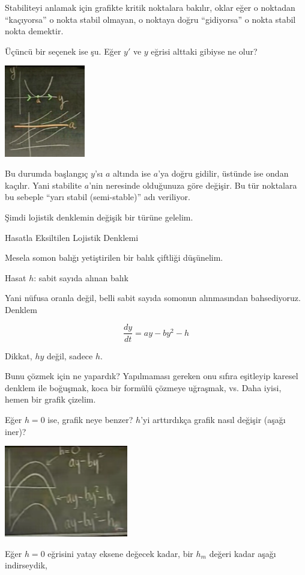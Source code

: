 \documentclass[12pt,fleqn]{article}\usepackage{../../common}
\begin{document}
Stabiliteyi anlamak için grafikte kritik noktalara bakılır, oklar eğer o
noktadan ``kaçıyorsa'' o nokta stabil olmayan, o noktaya doğru
``gidiyorsa'' o nokta stabil nokta demektir.

Üçüncü bir seçenek ise şu. Eğer $y'$ ve $y$ eğrisi alttaki gibiyse ne olur?

\includegraphics[height=4cm]{5_9.png}

Bu durumda başlangıç $y$'sı $a$ altında ise $a$'ya doğru gidilir, üstünde
ise ondan kaçılır. Yani stabilite $a$'nin neresinde olduğunuza göre
değişir. Bu tür noktalara bu sebeple ``yarı stabil (semi-stable)'' adı
veriliyor. 

Şimdi lojistik denklemin değişik bir türüne gelelim. 

Hasatla Eksiltilen Lojistik Denklemi

Mesela somon balığı yetiştirilen bir balık çiftliği düşünelim. 

Hasat $h$: sabit sayıda alınan balık

Yani nüfusa oranla değil, belli sabit sayıda somonun alınmasından
bahsediyoruz. Denklem

$$ \frac{dy}{dt} = ay - by^2 - h $$

Dikkat, $hy$ değil, sadece $h$. 

Bunu çözmek için ne yapardık? Yapılmaması gereken onu sıfıra eşitleyip
karesel denklem ile boğuşmak, koca bir formülü çözmeye uğraşmak, vs. Daha
iyisi, hemen bir grafik çizelim. 

Eğer $h=0$ ise, grafik neye benzer? $h$'yi arttırdıkça grafik nasıl değişir
(aşağı iner)? 

\includegraphics[height=4cm]{5_10.png}

Eğer $h=0$ eğrisini yatay eksene değecek kadar, bir $h_m$ değeri kadar
aşağı indirseydik, 
\end{document}
